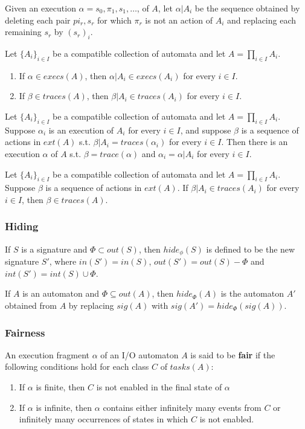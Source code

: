 \documentclass[11pt]{article}
\begin{document}
Given an execution \(\alpha=s_0,\pi_1,s_1,\dots\), of \(A\), let \(\alpha|A_i\) be the sequence
obtained by deleting each pair \(pi_r,s_r\) for which \(\pi_r\) is not an action of \(A_i\) and
replacing each remaining \(s_r\) by \((s_r)_i\).

\begin{theorem}[]
Let \(\{A_i\}_{i\in I}\) be a compatible collection of automata and let \(A=\prod_{i\in I}A_i\).
\begin{enumerate}
\item If \(\alpha\in execs(A)\), then \(\alpha|A_i\in execs(A_i)\) for every \(i\in I\).
\item If \(\beta\in traces(A)\), then \(\beta|A_i\in traces(A_i)\) for every \(i\in I\).
\end{enumerate}
\end{theorem}

\begin{theorem}[]
Let \(\{A_i\}_{i\in I}\) be a compatible collection of automata and let \(A=\prod_{i\in I}A_i\).
Suppose \(\alpha_i\) is an execution of \(A_i\) for every \(i\in I\), and suppose \(\beta\) is a
sequence of actions in \(ext(A)\) s.t. \(\beta|A_i=traces(\alpha_i)\) for every \(i\in I\). Then there
is an execution \(\alpha\) of \(A\) s.t. \(\beta=trace(\alpha)\) and \(\alpha_i=\alpha|A_i\) for every
\(i\in I\).
\end{theorem}

\begin{theorem}[]
Let \(\{A_i\}_{i\in I}\)  be a compatible collection of automata and let \(A=\prod_{i\in I}A_i\).
Suppose \(\beta\) is a sequence of actions in \(ext(A)\). If \(\beta|A_i\in traces(A_i)\) for every
\(i\in I\), then \(\beta\in traces(A)\).
\end{theorem}
\subsubsection{Hiding}
\label{sec:orgc7d6418}
If \(S\) is a signature and \(\Phi\subset out(S)\), then \(hide_\phi(S)\) is defined to be the new
signature \(S'\), where \(in(S')=in(S)\), \(out(S')=out(S)-\Phi\) and \(int(S')=int(S)\cup\Phi\).

If \(A\) is an automaton and \(\Phi\subseteq out(A)\), then \(hide_\Phi(A)\) is the automaton \(A'\)
obtained from \(A\) by replacing \(sig(A)\) with \(sig(A')=hide_\Phi(sig(A))\).
\subsubsection{Fairness}
\label{sec:orgb546c52}
An execution fragment \(\alpha\) of an I/O automaton \(A\) is said to be \textbf{fair} if the following
conditions hold for each class \(C\) of \(tasks(A)\):
\begin{enumerate}
\item If \(\alpha\) is finite, then \(C\) is not enabled in the final state of \(\alpha\)
\item If \(\alpha\) is infinite, then \(\alpha\) contains either infinitely many events from \(C\) or
infinitely many occurrences of states in which \(C\) is not enabled.
\end{enumerate}
\end{document}
